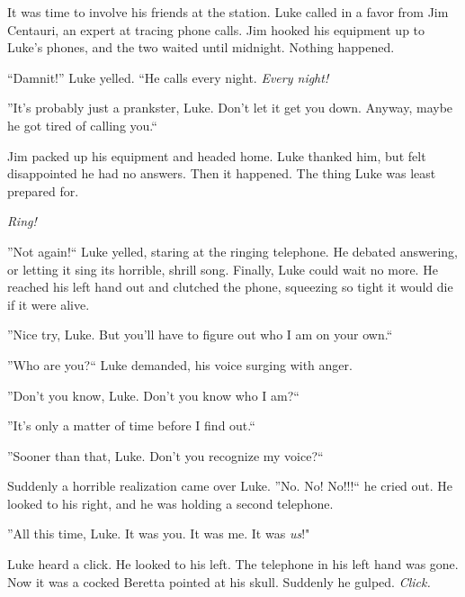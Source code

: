 It was time to involve his friends at the station. Luke called in a
favor from Jim Centauri, an expert at tracing phone calls. Jim
hooked his equipment up to Luke's phones, and the two waited until
midnight. Nothing happened.



``Damnit!'' Luke yelled. ``He calls every night. {\em Every
night!}



''It's probably just a prankster, Luke. Don't let it get you down.
Anyway, maybe he got tired of calling you.``



Jim packed up his equipment and headed home. Luke thanked him, but
felt disappointed he had no answers. Then it happened. The thing
Luke was least prepared for.



{\em Ring!}



''Not again!`` Luke yelled, staring at the ringing telephone. He
debated answering, or letting it sing its horrible, shrill song.
Finally, Luke could wait no more. He reached his left hand out and
clutched the phone, squeezing so tight it would die if it were
alive.



''Nice try, Luke. But you'll have to figure out who I am on your
own.``



''Who are you?`` Luke demanded, his voice surging with anger.



''Don't you know, Luke. Don't you know who I am?``



''It's only a matter of time before I find out.``



''Sooner than that, Luke. Don't you recognize my voice?``



Suddenly a horrible realization came over Luke. ''No. No! No!!!`` he
cried out. He looked to his right, and he was holding a second
telephone.



''All this time, Luke. It was you. It was me. It was
{\em us}!"



Luke heard a click. He looked to his left. The telephone in his
left hand was gone. Now it was a cocked Beretta pointed at his
skull. Suddenly he gulped. {\em Click.} 

 






